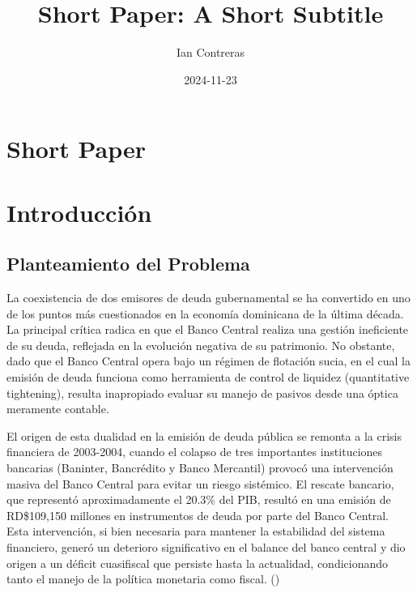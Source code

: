 \documentclass[
  man,
  longtable,
  nolmodern,
  notxfonts,
  notimes,
  colorlinks=true,linkcolor=blue,citecolor=blue,urlcolor=blue]{apa7}
\title{Short Paper: A Short Subtitle}
\author{Ian Contreras}
\affiliation{
{Economía y Negocios, Instituto Tecnológico de Santo Domingo}}
\date{2024-11-23}
\begin{document}
\maketitle

\hypertarget{toc}{}
\tableofcontents
\newpage
\section[Introduction]{Short Paper}

\setcounter{secnumdepth}{-\maxdimen} %

\setlength\LTleft{0pt}


\section{Introducción}\label{introducciuxf3n}

\subsection{Planteamiento del
Problema}\label{planteamiento-del-problema}

La coexistencia de dos emisores de deuda gubernamental se ha convertido
en uno de los puntos más cuestionados en la economía dominicana de la
última década. La principal crítica radica en que el Banco Central
realiza una gestión ineficiente de su deuda, reflejada en la evolución
negativa de su patrimonio. No obstante, dado que el Banco Central opera
bajo un régimen de flotación sucia, en el cual la emisión de deuda
funciona como herramienta de control de liquidez (quantitative
tightening), resulta inapropiado evaluar su manejo de pasivos desde una
óptica meramente contable.

El origen de esta dualidad en la emisión de deuda pública se remonta a
la crisis financiera de 2003-2004, cuando el colapso de tres importantes
instituciones bancarias (Baninter, Bancrédito y Banco Mercantil) provocó
una intervención masiva del Banco Central para evitar un riesgo
sistémico. El rescate bancario, que representó aproximadamente el 20.3\%
del PIB, resultó en una emisión de RD\$109,150 millones en instrumentos
de deuda por parte del Banco Central. Esta intervención, si bien
necesaria para mantener la estabilidad del sistema financiero, generó un
deterioro significativo en el balance del banco central y dio origen a
un déficit cuasifiscal que persiste hasta la actualidad, condicionando
tanto el manejo de la política monetaria como fiscal.
()
\end{document}
